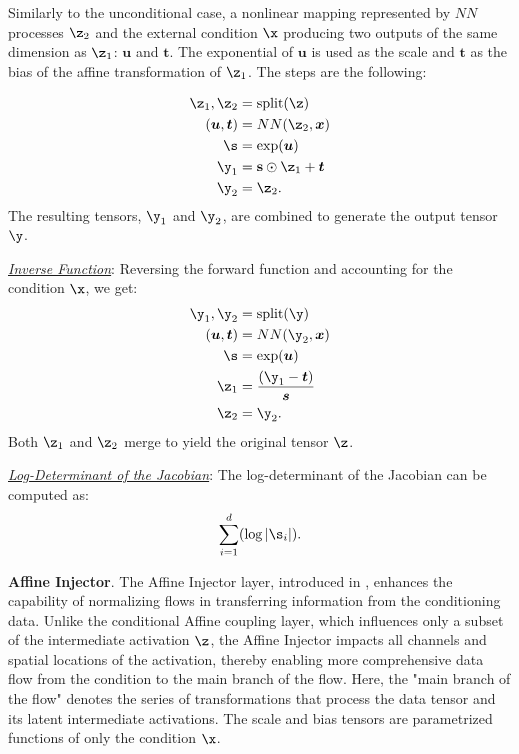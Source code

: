 Similarly to the unconditional case, a nonlinear mapping represented by $NN$ processes \(\z_2\) and the external condition \(\x\) producing two outputs of the same dimension as \(\z_1\): \(\boldsymbol{u}\) and \(\boldsymbol{t}\). The exponential of \(\boldsymbol{u}\) is used as the scale and $\boldsymbol{t}$ as the bias of the affine transformation of \(\z_1\). The steps are the following:


\begin{align*}
\z_1, \z_2 &= \text{split}(\z) \\
(\boldsymbol{u},\boldsymbol{t}) &= NN(\z_2, \boldsymbol{x}) \\
\s &= \exp(\boldsymbol{u}) \\
\y_1 &= \textbf{s} \odot \z_1 + \boldsymbol{t} \\
\y_2 &= \z_2.
\end{align*}
The resulting tensors, \(\y_1\) and \(\y_2\), are combined to generate the output tensor \(\y\).

\smallskip

\textit{\underline{Inverse Function}}: Reversing the forward function and accounting for the condition \(\x\), we get:
\begin{align*}
\y_1, \y_2 &= \text{split}(\y) \\
(\boldsymbol{u},\boldsymbol{t}) &= NN(\y_2, \boldsymbol{x}) \\
\s &= \exp(\boldsymbol{u}) \\
\z_1 &= \frac{(\y_1 - \boldsymbol{t})}{\boldsymbol{s}} \\
\z_2 &= \y_2.
\end{align*}
Both \(\z_1\) and \(\z_2\) merge to yield the original tensor \(\z\).


\smallskip

\textit{\underline{Log-Determinant of the Jacobian}}: The log-determinant of the Jacobian can be computed as:
\[\sum_{i=1}^{d}(\log |\s_i|).\]

\textbf{Affine Injector}. The Affine Injector layer, introduced in \cite{SRFLOW}, enhances the capability of normalizing flows in transferring information from the conditioning data. Unlike the conditional Affine coupling layer, which influences only a subset of the intermediate activation \(\z\), the Affine Injector impacts all channels and spatial locations of the activation, thereby enabling more comprehensive data flow from the condition to the main branch of the flow. Here, the "main branch of the flow" denotes the series of transformations that process the data tensor and its latent intermediate activations. The scale and bias tensors are parametrized functions of only the condition \(\x\).

